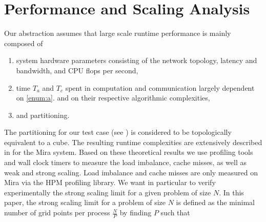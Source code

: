 \documentclass{sig-alternate}
\begin{document}





\section{Performance and Scaling Analysis}
\label{sec:analysis}
Our abstraction assumes that large scale runtime performance is mainly composed
of
\begin{enumerate}
  \item system hardware parameters consisting of the network topology, latency and
    bandwidth\label{enum:a}, and CPU flops per second, 
  \item time $T_a$ and $T_c$ spent in computation and communication largely
    dependent on \ref{enum:a}. and on their respective algorithmic complexities,
  \item and partitioning.\label{enum:c}
\end{enumerate}

The partitioning for our test case (see ) is considered to be
topologically equivalent to a cube. The resulting runtime complexities are
extensively described in \cite{fischer:scaling} for the Mira system. Based on
these theoretical results we use profiling tools and wall clock timers to
measure the load imbalance,
cache misses, as well as weak and strong scaling. Load imbalance and cache
misses are only measured on Mira via the HPM profiling library. 
We want in particular to verify
experimentally the strong scaling limit for a given problem of size $N$. 
In this paper, the strong scaling limit for a problem of size $N$ is defined
as the minimal number of grid points per process $\frac{N}{P}$ by finding $P$ such that
\end{document}
